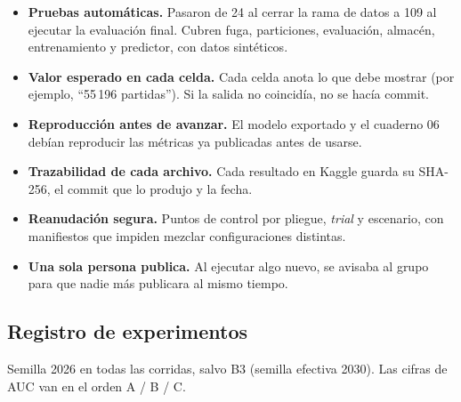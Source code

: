 \begin{itemize}
  \item \textbf{Pruebas autom\'aticas.} Pasaron de 24 al cerrar la rama de
        datos a 109 al ejecutar la evaluaci\'on final. Cubren fuga,
        particiones, evaluaci\'on, almac\'en, entrenamiento y predictor, con
        datos sint\'eticos.
  \item \textbf{Valor esperado en cada celda.} Cada celda anota lo que debe
        mostrar (por ejemplo, ``55\,196 partidas''). Si la salida no
        coincid\'ia, no se hac\'ia commit.
  \item \textbf{Reproducci\'on antes de avanzar.} El modelo exportado y el
        cuaderno 06 deb\'ian reproducir las m\'etricas ya publicadas antes de
        usarse.
  \item \textbf{Trazabilidad de cada archivo.} Cada resultado en Kaggle
        guarda su SHA-256, el commit que lo produjo y la fecha.
  \item \textbf{Reanudaci\'on segura.} Puntos de control por pliegue,
        \textit{trial} y escenario, con manifiestos que impiden mezclar
        configuraciones distintas.
  \item \textbf{Una sola persona publica.} Al ejecutar algo nuevo, se
        avisaba al grupo para que nadie m\'as publicara al mismo tiempo.
\end{itemize}

\subsection{Registro de experimentos}
\label{subsec:registro}

Semilla 2026 en todas las corridas, salvo B3 (semilla efectiva 2030). Las
cifras de AUC van en el orden A / B / C.

